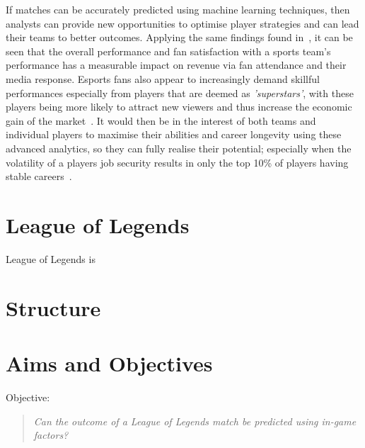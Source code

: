 If matches can be accurately predicted using machine learning techniques, then analysts can provide new opportunities to optimise player strategies and can lead their teams to better outcomes.
Applying the same findings found in~\citet{gray2012customer}, it can be seen that the overall performance and fan satisfaction with a sports team's performance has a measurable impact on revenue via fan attendance and their media response.
\ac{Esports} fans also appear to increasingly demand skillful performances especially from players that are deemed as \emph{'superstars'}, with these players being more likely to attract new viewers and thus increase the economic gain of the market~\citep{mangeloja2019economics, ward2019esport}.
It would then be in the interest of both teams and individual players to maximise their abilities and career longevity using these advanced analytics, so they can fully realise their potential;
especially when the volatility of a players job security results in only the top 10\% of players having stable careers~\citep{ward2019esport}.\\


\section{League of Legends}\label{sec:League of Legends}
League of Legends is \citep{playercount}

\section{Structure}\label{sec:Structure}
\lipsum[1-5]

\section{Aims and Objectives}\label{sec:Aims and Objectives}

Objective: \begin{quote}  \emph{Can the outcome of a League of Legends match be predicted using in-game factors?} \end{quote}